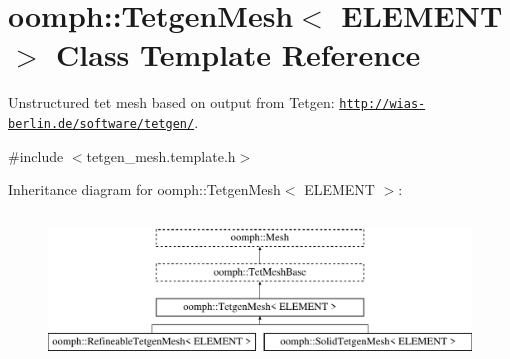 \hypertarget{classoomph_1_1TetgenMesh}{}\section{oomph\+:\+:Tetgen\+Mesh$<$ E\+L\+E\+M\+E\+NT $>$ Class Template Reference}
\label{classoomph_1_1TetgenMesh}


Unstructured tet mesh based on output from Tetgen\+: \href{http://wias-berlin.de/software/tetgen/}{\tt http\+://wias-\/berlin.\+de/software/tetgen/}.  




{\ttfamily \#include $<$tetgen\+\_\+mesh.\+template.\+h$>$}

Inheritance diagram for oomph\+:\+:Tetgen\+Mesh$<$ E\+L\+E\+M\+E\+NT $>$\+:\begin{figure}[H]
\begin{center}
\leavevmode
\includegraphics[height=4.000000cm]{classoomph_1_1TetgenMesh}
\end{center}
\end{figure}
